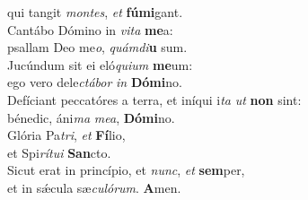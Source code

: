 \oddverse qui tangit \textit{mon}\textit{tes}, \textit{et} \textbf{fú}\textbf{mi}gant.\\
\evenverse Cantábo Dómino in \textit{vi}\textit{ta} \textbf{me}a:~\*\\
\evenverse psallam Deo me\textit{o}, \textit{quám}\textit{di}\textbf{u} sum.\\
\oddverse Jucúndum sit ei eló\textit{qui}\textit{um} \textbf{me}um:~\*\\
\oddverse ego vero dele\textit{ctá}\textit{bor} \textit{in} \textbf{Dó}\textbf{mi}no.\\
\evenverse Defíciant peccatóres a terra, et iníqui i\textit{ta} \textit{ut} \textbf{non} sint:~\*\\
\evenverse bénedic, áni\textit{ma} \textit{me}\textit{a}, \textbf{Dó}\textbf{mi}no.\\
\oddverse Glória Pa\textit{tri}, \textit{et} \textbf{Fí}lio,~\*\\
\oddverse et Spi\textit{rí}\textit{tu}\textit{i} \textbf{San}cto.\\
\evenverse Sicut erat in princípio, et \textit{nunc}, \textit{et} \textbf{sem}per,~\*\\
\evenverse et in sǽcula sæ\textit{cu}\textit{ló}\textit{rum}. \textbf{A}men.\\
